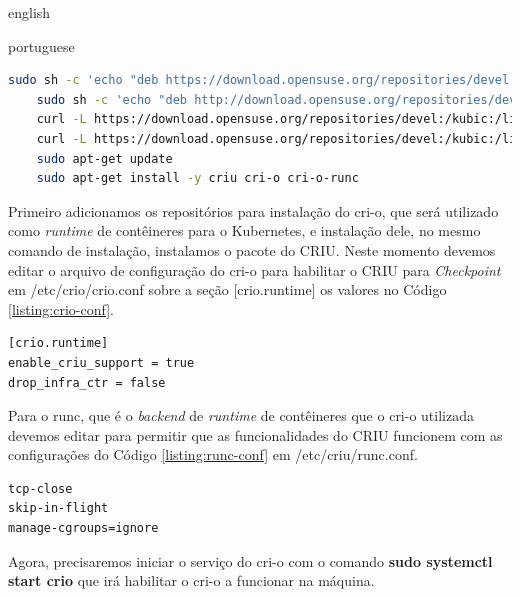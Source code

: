 \begin{otherlanguage*}{english}
\begin{otherlanguage*}{portuguese}
\begin{lstlisting}[language=bash,caption={Comandos de configuração da máquina para CRIU e cri-o.},label={listing:setup-script}]
   sudo sh -c 'echo "deb https://download.opensuse.org/repositories/devel:/kubic:/libcontainers:/stable/xUbuntu_20.04/ /" > /etc/apt/sources.list.d/devel:kubic:libcontainers:stable.list'
	sudo sh -c 'echo "deb http://download.opensuse.org/repositories/devel:/kubic:/libcontainers:/stable:/cri-o:/1.25/xUbuntu_20.04/ /" > /etc/apt/sources.list.d/devel:kubic:libcontainers:stable:cri-o:$CRIO_VERSION.list'
	curl -L https://download.opensuse.org/repositories/devel:/kubic:/libcontainers:/stable:/cri-o:/1.25/xUbuntu_20.04/Release.key | sudo apt-key add -
	curl -L https://download.opensuse.org/repositories/devel:/kubic:/libcontainers:/stable/xUbuntu_20.04/Release.key | sudo apt-key add -
	sudo apt-get update
	sudo apt-get install -y criu cri-o cri-o-runc
\end{lstlisting}

Primeiro adicionamos os repositórios para instalação do cri-o, que será utilizado como
\textit{runtime} de contêineres para o Kubernetes, e instalação dele, no mesmo comando
de instalação, instalamos o pacote do CRIU. Neste momento devemos editar o arquivo de
configuração do cri-o para habilitar o CRIU para \textit{Checkpoint} em /etc/crio/crio.conf
sobre a seção [crio.runtime] os valores no Código \ref{listing:crio-conf}.

\begin{lstlisting}[language=plaintext,caption={Configuração a ser incluída no arquivo de configurações do cri-o.},label={listing:crio-conf}]
[crio.runtime]
enable_criu_support = true
drop_infra_ctr = false
\end{lstlisting}

Para o runc, que é o \textit{backend} de \textit{runtime} de contêineres que o cri-o
utilizada devemos editar para permitir que as funcionalidades do CRIU funcionem com as
configurações do Código \ref{listing:runc-conf} em /etc/criu/runc.conf.

\begin{lstlisting}[language=plaintext,caption={Configuração a ser incluída no arquivo de configurações do runc para o CRIU.},label={listing:runc-conf}]
tcp-close
skip-in-flight
manage-cgroups=ignore
\end{lstlisting}

Agora, precisaremos iniciar o serviço do cri-o com o comando \textbf{sudo systemctl start crio}
que irá habilitar o cri-o a funcionar na máquina.


\end{otherlanguage*}
\end{otherlanguage*}
